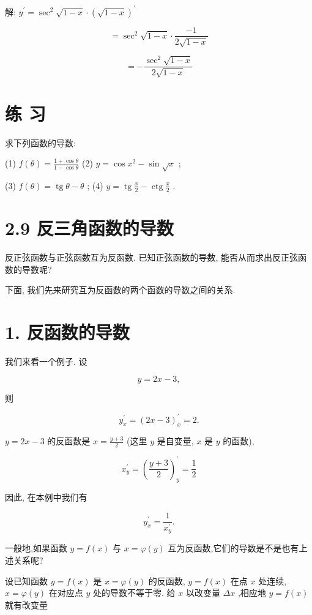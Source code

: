 \documentclass[10pt]{article}
\begin{document}
解: \({y}^{\prime } = {\sec }^{2}\sqrt{1 - x} \cdot {\left( \sqrt{1 - x}\right) }^{\prime }\)

\[
= {\sec }^{2}\sqrt{1 - x} \cdot \frac{-1}{2\sqrt{1 - x}}
\]

\[
= - \frac{{\sec }^{2}\sqrt{1 - x}}{2\sqrt{1 - x}}
\]

\section*{练 习}

求下列函数的导数:

(1) \(f\left( \theta \right) = \frac{1 + \cos \theta }{1 - \cos \theta }\) (2) \(y = \cos {x}^{2} - \sin \sqrt{x}\) ;

(3) \(f\left( \theta \right) = \operatorname{tg}\theta - \theta\) ; (4) \(y = \operatorname{tg}\frac{x}{2} - \operatorname{ctg}\frac{x}{2}\) .

\section*{2.9 反三角函数的导数}

反正弦函数与正弦函数互为反函数. 已知正弦函数的导数, 能否从而求出反正弦函数的导数呢?

下面, 我们先来研究互为反函数的两个函数的导数之间的关系.

\section*{1. 反函数的导数}

我们来看一个例子. 设

\[
y = {2x} - 3,
\]

则

\[
{y}_{x}^{\prime } = {\left( 2x - 3\right) }_{x}^{\prime } = 2.
\]

\(y = {2x} - 3\) 的反函数是 \(x = \frac{y + 3}{2}\) (这里 \(y\) 是自变量, \(x\) 是 \(y\) 的函数),

\[
{x}_{y}^{\prime } = {\left( \frac{y + 3}{2}\right) }_{y}^{\prime } = \frac{1}{2}
\]

因此, 在本例中我们有

\[
{y}_{x}^{\prime } = \frac{1}{{x}_{y}^{\prime }}.
\]

一般地,如果函数 \(y = f\left( x\right)\) 与 \(x = \varphi \left( y\right)\) 互为反函数,它们的导数是不是也有上述关系呢?

设已知函数 \(y = f\left( x\right)\) 是 \(x = \varphi \left( y\right)\) 的反函数, \(y = f\left( x\right)\) 在点 \(x\) 处连续, \(x = \varphi \left( y\right)\) 在对应点 \(y\) 处的导数不等于零. 给 \(x\) 以改变量 \({\Delta x}\) ,相应地 \(y = f\left( x\right)\) 就有改变量
\end{document}

